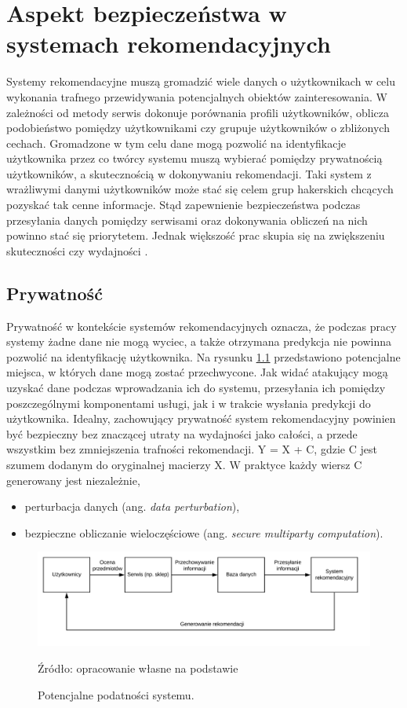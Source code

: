 
\chapter{Aspekt bezpieczeństwa w systemach rekomendacyjnych}
Systemy rekomendacyjne muszą gromadzić wiele danych o użytkownikach w celu wykonania trafnego przewidywania potencjalnych obiektów zainteresowania. W zależności od metody serwis dokonuje porównania  profili użytkowników, oblicza podobieństwo pomiędzy użytkownikami czy grupuje użytkowników o zbliżonych cechach. Gromadzone w tym celu dane mogą pozwolić na identyfikacje użytkownika przez co twórcy systemu muszą wybierać pomiędzy prywatnością użytkowników, a skutecznością w dokonywaniu rekomendacji. Taki system z wrażliwymi danymi użytkowników może stać się celem grup hakerskich chcących pozyskać tak cenne informacje. Stąd zapewnienie bezpieczeństwa podczas przesyłania danych pomiędzy serwisami oraz dokonywania obliczeń na nich powinno stać się priorytetem. Jednak większość prac skupia się na zwiększeniu skuteczności czy wydajności \cite{recent_developments}.

\section{Prywatność}
Prywatność w kontekście systemów rekomendacyjnych oznacza, że podczas pracy systemy żadne dane nie mogą wyciec, a także otrzymana predykcja nie powinna pozwolić na identyfikację użytkownika. Na rysunku \ref{fig:podatnosci} przedstawiono potencjalne miejsca, w których dane mogą zostać przechwycone. Jak widać atakujący mogą uzyskać dane podczas wprowadzania ich do systemu, przesyłania ich pomiędzy poszczególnymi komponentami usługi, jak i w trakcie wysłania predykcji do użytkownika. Idealny, zachowujący prywatność system rekomendacyjny powinien być bezpieczny bez znaczącej utraty na wydajności jako całości, a przede wszystkim bez zmniejszenia trafności rekomendacji. 
    Y = X + C, gdzie C jest szumem dodanym do oryginalnej macierzy X. W praktyce każdy wiersz C generowany jest niezależnie,
\begin{itemize}
    \item perturbacja danych (ang. \textit{data perturbation}),
    \item bezpieczne obliczanie wieloczęściowe (ang. \textit{secure multiparty computation}).
\end{itemize}

\begin{figure}
    \centering
    \includegraphics[scale=0.85]{images/podatnosci.png}
    \caption{Potencjalne podatności systemu.}    Źródło: opracowanie własne na podstawie \cite{practicalPrivacy}

    \label{fig:podatnosci}
\end{figure}
